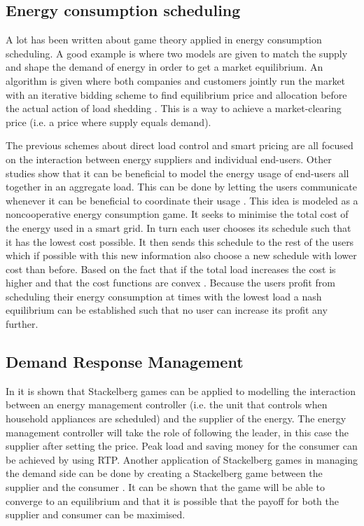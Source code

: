 \subsection{Energy consumption scheduling}
A lot has been written about game theory applied in energy consumption scheduling. A good example is \cite{ChenLiLowEtAl2010} where two models are given to match the supply and shape the demand of energy in order to get a market equilibrium. An algorithm is given where both companies and customers jointly run the market with an iterative bidding scheme to find equilibrium price and allocation before the actual action of load shedding \cite{ChenLiLowEtAl2010}. This is a way to achieve a market-clearing price (i.e. a price where supply equals demand).

The previous schemes about direct load control and smart pricing are all focused on the interaction between energy suppliers and individual end-users. Other studies show \cite{Mohsenian-RadWongJatskevichEtAl2010a} that it can be beneficial to model the energy usage of end-users all together in an aggregate load. This can be done by letting the users communicate whenever it can be beneficial to coordinate their usage \cite{Mohsenian-RadWongJatskevichEtAl2010a}. This idea is modeled as a noncooperative energy consumption game. It seeks to minimise the total cost of the energy used in a smart grid. In turn each user chooses its schedule such that it has the lowest cost possible. It then sends this schedule to the rest of the users which if possible with this new information also choose a new schedule with lower cost than before. Based on the fact that if the total load increases the cost is higher and that the cost functions are convex \cite{Mohsenian-RadLeon-Garcia2010}. Because the users profit from scheduling their energy consumption at times with the lowest load a nash equilibrium can be established such that no user can increase its profit any further.


\subsection{Demand Response Management}
In \cite{ChenKishoreSnyder2011} it is shown that Stackelberg games can be applied to modelling the interaction between an energy management controller (i.e. the unit that controls when household appliances are scheduled) and the supplier of the energy. The energy management controller will take the role of following the leader, in this case the supplier after setting the price. Peak load and saving money for the consumer can be achieved by using RTP. Another application of Stackelberg games in managing the demand side can be done by creating a Stackelberg game between the supplier and the consumer \cite{MaharjanZhuZhangEtAl2013}. It can be shown that the game will be able to converge to an equilibrium and that it is possible that the payoff for both the supplier and consumer can be maximised. 